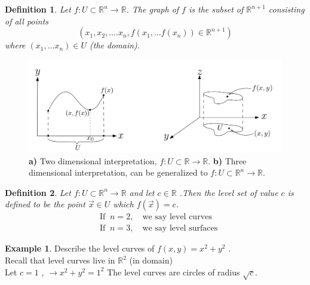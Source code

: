 \documentclass[
	12pt,
	]{article}
\newcommand{\Rn}{\mathbb{R}^{n}}
\newcommand{\R}{\mathbb{R}}
\theoremstyle{custom}
\theoremstyle{custom}
\theoremstyle{custom}
\theoremstyle{custom}
\newtheorem{definition}{Definition}[section]
\theoremstyle{custom}
\theoremstyle{definition}
\newtheorem{example}{Example}[section]
\theoremstyle{example}
\theoremstyle{note}
\theoremstyle{remark}
\theoremstyle{example}
\newcounter{theo}[section]\setcounter{theo}{0}
\numberwithin{equation}{subsection}
\begin{document}
	\begin{definition}
		Let $f : U \subset \Rn \to \R$. The graph of $ f $ is the subset of $\mathbb{R}^{n+1}$ consisting of all points $$(x_{1},x_{2 }, \dots . x_{n}, f(x_{1} , \dots f(x_{n})) \in \mathbb{R}^{n+1})$$ where $ (x_{1}, \dots x_{n}) \in U $ (the domain).
	\end{definition} 
	\begin{figure}[H]
		   		 	\centering
		   		 	\includegraphics[width=\linewidth]{MATH314_Notes_Fig1.png}
		   		 	\captionsetup{margin=1cm, justification=raggedright}\caption{\textbf{a)} Two dimensional  interpretation, $f:U\subset \R \to \R$. \textbf{b)} Three dimensional interpretation, can be generalized to $f:U\subset \Rn \to \R$.}
		   		 \end{figure}  
	
	\begin{definition}
		Let $f: U \subset \Rn \to \R$ and let $ c\in \R $ .Then the level set of value $ c $ is defined to be the point $\vec{x} \in U$ which $f(\vec{x}) = c$. 
		\begin{align*}
			&\text{If } \ n =2 , \quad \text{we say level curves} \\
			&\text{If } \ n =3 , \quad \text{we say level surfaces}
		\end{align*}
	\end{definition}
	
	\begin{example}
		Describe the level curves of $f(x,y) = x^{2} + y^{2}$ .\\
		Recall that level curves live in $\mathbb{R}^{2}$ (in domain) \\
		Let $c = 1$ , $\xrightarrow \ x^{2} + y^{2} = 1^{2}$
		The level curves are circles of radius $\sqrt{c}$. 
	\end{example}
	
\end{document}
